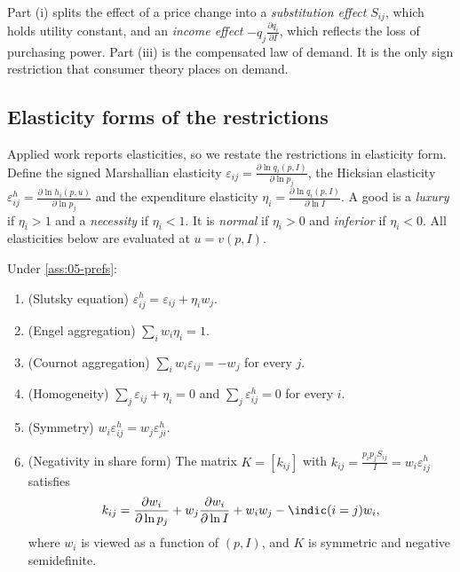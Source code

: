 Part (i) splits the effect of a price change into a \emph{substitution effect} $S_{ij}$, which holds utility
constant, and an \emph{income effect} $-q_j\frac{\partial q_i}{\partial I}$, which reflects the loss of
purchasing power. Part (iii) is the compensated law of demand. It is the only sign restriction that consumer
theory places on demand.

\subsection{Elasticity forms of the restrictions}\label{sec:05-elasticity-identities}

Applied work reports elasticities, so we restate the restrictions in elasticity form. Define the signed
Marshallian elasticity $\varepsilon_{ij} = \frac{\partial\ln q_i(p, I)}{\partial\ln p_j}$, the Hicksian
elasticity $\varepsilon^h_{ij} = \frac{\partial\ln h_i(p, u)}{\partial\ln p_j}$ and the expenditure elasticity
$\eta_i = \frac{\partial\ln q_i(p, I)}{\partial\ln I}$. A good is a \emph{luxury} if $\eta_i > 1$ and a
\emph{necessity} if $\eta_i < 1$. It is \emph{normal} if $\eta_i > 0$ and \emph{inferior} if $\eta_i < 0$.
All elasticities below are evaluated at $u = v(p, I)$.

\begin{proposition}\label{prop:05-elast-identities}
Under \cref{ass:05-prefs}:
\begin{enumerate}[label=(\alph*)]
\item (Slutsky equation) $\varepsilon^h_{ij} = \varepsilon_{ij} + \eta_iw_j$.
\item (Engel aggregation) $\sum_i w_i\eta_i = 1$.
\item (Cournot aggregation) $\sum_i w_i\varepsilon_{ij} = -w_j$ for every $j$.
\item (Homogeneity) $\sum_j\varepsilon_{ij} + \eta_i = 0$ and $\sum_j\varepsilon^h_{ij} = 0$ for every $i$.
\item (Symmetry) $w_i\varepsilon^h_{ij} = w_j\varepsilon^h_{ji}$.
\item (Negativity in share form) The matrix $K = [k_{ij}]$ with
  $k_{ij} = \frac{p_ip_jS_{ij}}{I} = w_i\varepsilon^h_{ij}$ satisfies
  \begin{equation}\label{eq:05-K-general}
  k_{ij} = \frac{\partial w_i}{\partial\ln p_j} + w_j\frac{\partial w_i}{\partial\ln I} + w_iw_j - \indic(i=j)w_i ,
  \end{equation}
  where $w_i$ is viewed as a function of $(p, I)$, and $K$ is symmetric and negative semidefinite.
\end{enumerate}
\end{proposition}

